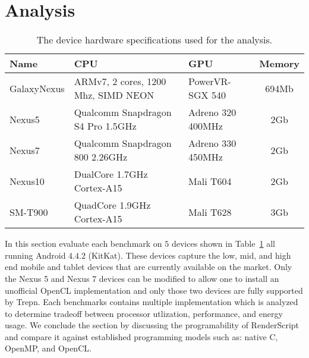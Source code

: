 \section{Analysis}
\label{sec:analysis}


\begin{table}
\centering
\begin{tabular}{ | l | p{2.1cm} | p{1.7cm} | c |}
    \hline 
    Name & CPU & GPU & Memory \\ \hline
    GalaxyNexus & ARMv7, 2 cores, 1200 Mhz, SIMD NEON & PowerVR-SGX 540 & 694Mb \\ \hline
    Nexus5 & Qualcomm Snapdragon S4 Pro 1.5GHz & Adreno 320 400MHz & 2Gb \\ \hline
    Nexus7 & Qualcomm Snapdragon 800 2.26GHz & Adreno 330 450MHz & 2Gb \\ \hline
    Nexus10 & DualCore 1.7GHz Cortex-A15 & Mali T604 & 2Gb \\ \hline
    SM-T900 & QuadCore 1.9GHz Cortex-A15 & Mali T628 & 3Gb \\ \hline
    \hline
\end{tabular}
\caption{The device hardware specifications used for the analysis.}
\label{table:hardware}
\end{table}

In this section evaluate each benchmark on $5$ devices shown
  in Table~\ref{table:hardware} all running Android $4.4.2$ (KitKat).
These devices capture the low, mid, and high end mobile and tablet
  devices that are currently available on the market.
Only the Nexus 5 and Nexus 7 devices can be modified to allow one to install an
  unofficial OpenCL implementation and only those two devices are fully supported
  by Trepn.
Each benchmarks contains multiple implementation which 
  is analyzed to determine tradeoff between
  processor utlization, performance, and energy usage.
We conclude the section by discussing the programability of RenderScript
  and compare it against established programming models such as:
  native C, OpenMP, and OpenCL.






